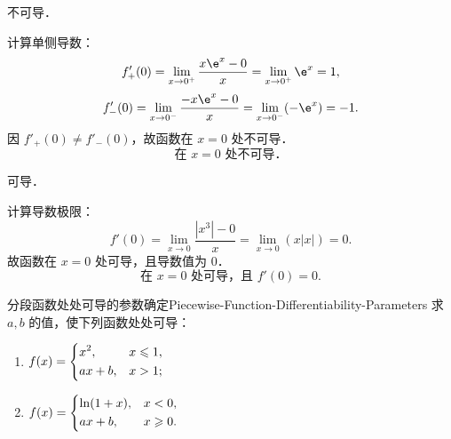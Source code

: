 \begin{solution}
     不可导．

    计算单侧导数：
    \begin{equation}
        f'_+(0) = \lim_{x\to 0^+} \frac{x\e^x - 0}{x} = \lim_{x\to 0^+} \e^x = 1,
    \end{equation}
    \begin{equation}
        f'_-(0) = \lim_{x\to 0^-} \frac{-x\e^x - 0}{x} = \lim_{x\to 0^-} (-\e^x) = -1.
    \end{equation}
    因 $f'_+(0) \neq f'_-(0)$，故函数在 $x = 0$ 处不可导．
    \begin{equation}
        \boxed{\text{在 } x = 0 \text{ 处不可导．}}
    \end{equation}

     可导．

    计算导数极限：
    \begin{equation}
        f'(0) = \lim_{x\to 0} \frac{|x^3| - 0}{x} = \lim_{x\to 0} \left( x |x| \right) = 0.
    \end{equation}
    故函数在 $x = 0$ 处可导，且导数值为 $0$．
    \begin{equation}
        \boxed{\text{在 } x = 0 \text{ 处可导，且 } f'(0) = 0.}
    \end{equation}
\end{solution}

\begin{problem}{分段函数处处可导的参数确定}{Piecewise-Function-Differentiability-Parameters}
    求 $a, b$ 的值，使下列函数处处可导：
    \begin{enumerate}
        \item $f(x) = \begin{dcases} x^2, & x \leqslant 1, \\ ax + b, & x > 1; \end{dcases}$
        \item $f(x) = \begin{dcases} \ln(1 + x), & x < 0, \\ ax + b, & x \geqslant 0. \end{dcases}$
    \end{enumerate}
\end{problem}

